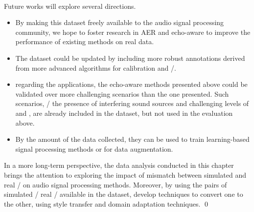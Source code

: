 \mynewline
\\Future works will explore several directions.
\begin{itemize}
    \item By making this dataset freely available to the audio signal processing community, we hope to foster research in AER and echo-aware to improve the performance of existing methods on real data.
    \item The dataset could be updated by including more robust annotations derived from more advanced algorithms for calibration and \AER/.
    \item regarding the applications, the echo-aware methods presented above could be validated over more challenging scenarios than the one presented.
    Such scenarios, \eg/ the presence of interfering sound sources and challenging levels of \SNR{} and \RT{}, are already included in the dataset, but not used in the evaluation above.
    \item By the amount of the data collected, they can be used to train learning-based signal processing methods or for data augmentation.
\end{itemize}
In a more long-term perspective, the data analysis conducted in this chapter brings the attention to exploring the impact of mismatch between simulated and real \RIR/ on audio signal processing methods.
Moreover, by using the pairs of simulated \vs/ real \RIRs/ available in the dataset, develop techniques to convert one to the other, using style transfer and domain adaptation techniques.
\qed
